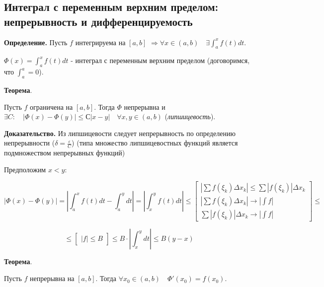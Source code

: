\documentclass[a4paper]{article}
\begin{document}
\begin{definit}
\hypertarget{p12}{}
\subsection*{Интеграл с переменным верхним пределом: непрерывность и дифференцируемость}

\textbf{Определение.} Пусть $f$ интегрируема на $[a,b]$ $\Rightarrow \forall x \in (a,b) \quad \exists \int_a^x f(t)dt$.

$\Phi(x) = \int_a^x f(t)dt$ - интеграл с переменным верхним пределом (договоримся, что $\int_a^a = 0$).

\begin{htheorem}\textbf{Теорема}.

Пусть $f$ ограничена на $[a,b]$. Тогда $\Phi$ непрерывна и \\ $\exists C: \quad |\Phi(x) - \Phi(y)| \leq С|x-y| \quad \forall x, y \in (a,b)$ (\textit{липшицевость}).
\end{htheorem}

\begin{hproof}\textbf{Доказательство.}
Из липшицевости следует непрерывность по определению непрерывности ($\delta = \frac{\varepsilon}{C}$) (типа множество липшицевостных функций является подмножеством непрерывных функций)


Предположим $x<y$:

\[
	|\Phi(x) - \Phi(y)| = \left| \int_a^x f(t)dt - \int_a^y dt \right| = \left| \int_x^y f(t)dt \right| \leq \begin{bmatrix}
	\left| \sum f(\xi_k) \Delta x_k \right| \leq \sum \left| f(\xi_k) \right| \Delta x_k \\
	\left| \sum f(\xi_k) \Delta x_k \right| \rightarrow |\int f| \\
	 \sum \left| f(\xi_k) \right| \Delta x_k \rightarrow |\int f|
	\end{bmatrix} \leq
\]
 
\[ \leq
 \begin{bmatrix}
 |f| \leq B
 \end{bmatrix} \leq B \cdot \left| \int_x^y dt \right| \leq B(y-x)
\]
\end{hproof}

\begin{htheorem}\textbf{Теорема}.

Пусть $f$ непрерывна на $[a,b]$. Тогда $\forall x_0 \in (a,b) \quad \Phi'(x_0) = f(x_0)$.
\end{htheorem}


\end{definit}
\end{document}
